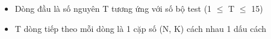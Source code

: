 \begin{itemize}
	\item     Dòng đầu là số nguyên T tương ứng với số bộ test (1  $\le$  T  $\le$  15)   
	\item     T dòng tiếp theo mỗi dòng là 1 cặp số (N, K) cách nhau 1 dấu cách   
\end{itemize}